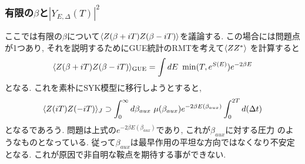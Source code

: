\subsubsection{有限の$\beta$と$|Y_{E,\Delta}(T)|^2$}
ここでは有限の$\beta$について$\langle Z(\beta + iT)Z(\beta - iT) \rangle$を議論する. 
この場合には問題点が1つあり, それを説明するためにGUE統計のRMTを考えて$\langle ZZ^* \rangle$
を計算すると
\begin{align}
	\langle Z(\beta + iT)Z(\beta - iT) \rangle_{\mathrm{GUE}}
	=\int dE\ \min(T, e^{S(E)})e^{-2\beta E}
\end{align}
となる. 
これを素朴にSYK模型に移行しようとすると, 
\begin{align}
	\langle Z(iT)Z(-iT) \rangle_J \supset
	\int_0^{\infty}d\beta_{aux}\ \mu(\beta_{aux})e^{-2\beta E(\beta_{aux})}
	\int_0^{2T} d(\Delta t)
\end{align}
となるであろう. 
問題は上式の$e^{-2\beta E(\beta_{aux})}$であり, これが$\beta_{aux}$に対する圧力
のようなものとなっている. 
従って$\beta_{aux}$は最早作用の平坦な方向ではなくなり不安定となる. 
これが原因で非自明な鞍点を期待する事ができない. 

